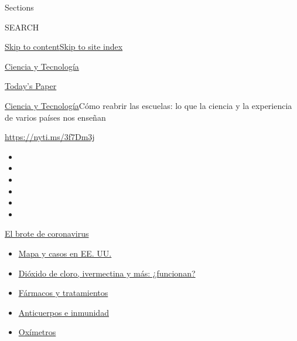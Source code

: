 Sections

SEARCH

\protect\hyperlink{site-content}{Skip to
content}\protect\hyperlink{site-index}{Skip to site index}

\href{https://www.nytimes.com/es/section/ciencia-y-tecnologia}{Ciencia y
Tecnología}

\href{https://myaccount.nytimes.com/auth/login?response_type=cookie\&client_id=vi}{}

\href{https://www.nytimes.com/section/todayspaper}{Today's Paper}

\href{/es/section/ciencia-y-tecnologia}{Ciencia y
Tecnología}\textbar{}Cómo reabrir las escuelas: lo que la ciencia y la
experiencia de varios países nos enseñan

\url{https://nyti.ms/3f7Dm3j}

\begin{itemize}
\item
\item
\item
\item
\item
\item
\end{itemize}

\href{https://www.nytimes.com/es/spotlight/coronavirus?action=click\&pgtype=Article\&state=default\&region=TOP_BANNER\&context=storylines_menu}{El
brote de coronavirus}

\begin{itemize}
\tightlist
\item
  \href{https://www.nytimes.com/es/interactive/2020/espanol/mundo/coronavirus-en-estados-unidos.html?action=click\&pgtype=Article\&state=default\&region=TOP_BANNER\&context=storylines_menu}{Mapa
  y casos en EE. UU.}
\item
  \href{https://www.nytimes.com/es/2020/07/23/espanol/america-latina/bolivia-cloro-coronavirus-ivermectina.html?action=click\&pgtype=Article\&state=default\&region=TOP_BANNER\&context=storylines_menu}{Dióxido
  de cloro, ivermectina y más: ¿funcionan?}
\item
  \href{https://www.nytimes.com/es/interactive/2020/science/coronavirus-tratamientos-curas.html?action=click\&pgtype=Article\&state=default\&region=TOP_BANNER\&context=storylines_menu}{Fármacos
  y tratamientos}
\item
  \href{https://www.nytimes.com/es/2020/07/28/espanol/ciencia-y-tecnologia/anticuerpos-coronavirus-inmunidad.html?action=click\&pgtype=Article\&state=default\&region=TOP_BANNER\&context=storylines_menu}{Anticuerpos
  e inmunidad}
\item
  \href{https://www.nytimes.com/es/2020/04/29/espanol/estilos-de-vida/oximetro-para-que-sirve.html?action=click\&pgtype=Article\&state=default\&region=TOP_BANNER\&context=storylines_menu}{Oxímetros}
\end{itemize}

